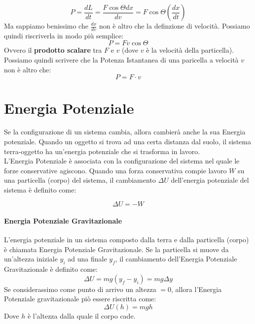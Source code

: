         \begin{equation*}
            P = \frac{dL}{dt} = \frac{F \cos \Theta dx}{dv} 
            = F \cos \Theta (\frac{dx}{dt})
        \end{equation*}
        Ma sappiamo benissimo che $\frac{dx}{dv}$ non è altro che la definzione 
        di velocità. Possiamo quindi riscriverla in modo più semplice:
        \begin{equation*}
            P = Fv\cos\Theta
        \end{equation*}
        Ovvero il \textbf{prodotto scalare} tra $F$ e $v$ (dove $v$ è la 
        velocità della particella). Possiamo quindi scrivere che la Potenza 
        Istantanea di una paricella a velocità $v$ non è altro che:
        \begin{equation}
            P = F \cdot v
        \end{equation}

    \section{Energia Potenziale} Se la configurazione di un sistema cambia, 
    allora cambierà anche la sua Energia potenziale. Quando un oggetto si trova
    ad una certa distanza dal suolo, il sistema terra-oggetto ha un'energia 
    potenziale che si trasforma in lavoro. \\
    L'Energia Potenziale è associata con la configurazione del sistema nel quale
    le forze conservative agiscono. Quando una forza conservativa compie lavoro
    $W$ su una particella (corpo) del sistema, il cambiamento $\Delta U$ 
    dell'energia potenziale del sistema è definito come:
        
        \begin{equation}
            \Delta U = - W
        \end{equation}

        \paragraph{Energia Potenziale Gravitazionale} L'energia potenziale in un
        sistema composto dalla terra e dalla particella (corpo) è chiamata 
        Energia Potenziale Gravitazionale. Se la particella si muove da 
        un'altezza iniziale $y_i$ ad una finale $y_f$, il cambiamento 
        dell'Energia Potenziale Gravitazionale è definito come:
        \begin{equation}
            \Delta U = mg(y_f - y_i) = mg \Delta y
        \end{equation}
        Se considerassimo come punto di arrivo un altezza $= 0$, allora 
        l'Energia Potenziale gravitazionale piò essere riscritta come:
        \begin{equation}
            \Delta U(h) = mgh
        \end{equation}
        Dove $h$ è l'altezza dalla quale il corpo cade.

